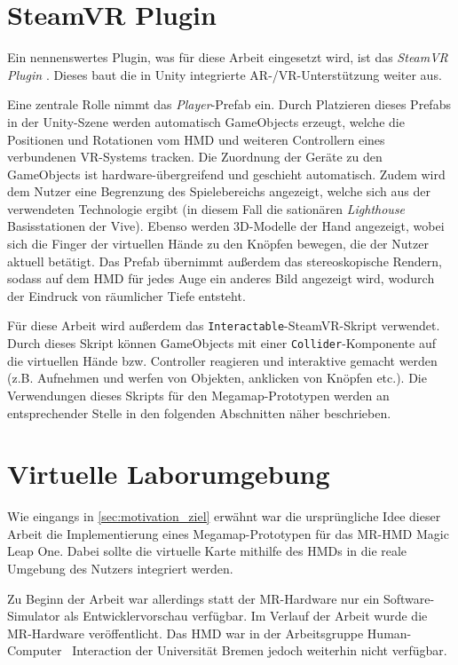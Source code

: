 \section{SteamVR Plugin}
Ein nennenswertes Plugin, was für diese Arbeit eingesetzt wird, ist das \emph{SteamVR Plugin} \autocite{ValveCorporation2018}.
Dieses baut die in Unity integrierte AR-/VR-Unterstützung weiter aus.

Eine zentrale Rolle nimmt das \emph{Player}-Prefab ein.
Durch Platzieren dieses Prefabs in der Unity-Szene werden automatisch GameObjects erzeugt, welche die Positionen und Rotationen vom HMD und weiteren Controllern eines verbundenen VR-Systems tracken.
Die Zuordnung der Geräte zu den GameObjects ist hardware-übergreifend und geschieht automatisch.
Zudem wird dem Nutzer eine Begrenzung des Spielebereichs angezeigt, welche sich aus der verwendeten Technologie ergibt (in diesem Fall die sationären \emph{Lighthouse} Basisstationen der Vive).
Ebenso werden 3D-Modelle der Hand angezeigt, wobei sich die Finger der virtuellen Hände zu den Knöpfen bewegen, die der Nutzer aktuell betätigt.
Das Prefab übernimmt außerdem das stereoskopische Rendern, sodass auf dem HMD für jedes Auge ein anderes Bild angezeigt wird, wodurch der Eindruck von räumlicher Tiefe entsteht.

Für diese Arbeit wird außerdem das \lstinline{Interactable}-SteamVR-Skript verwendet.
Durch dieses Skript können GameObjects mit einer \lstinline{Collider}-Komponente auf die virtuellen Hände bzw. Controller reagieren und interaktive gemacht werden (z.B. Aufnehmen und werfen von Objekten, anklicken von Knöpfen etc.).
Die Verwendungen dieses Skripts für den Megamap-Prototypen werden an entsprechender Stelle in den folgenden Abschnitten näher beschrieben.

\section{Virtuelle Laborumgebung}
Wie eingangs in \autoref{sec:motivation_ziel} erwähnt war die ursprüngliche Idee dieser Arbeit die Implementierung eines Megamap-Prototypen für das MR-HMD Magic Leap One.
Dabei sollte die virtuelle Karte mithilfe des HMDs in die reale Umgebung des Nutzers integriert werden.

Zu Beginn der Arbeit war allerdings statt der MR-Hardware nur ein Software-Simulator als Entwicklervorschau verfügbar.
Im Verlauf der Arbeit wurde die MR-Hardware veröffentlicht.
Das HMD war in der Arbeitsgruppe Human-Computer~ Interaction der Universität Bremen jedoch weiterhin nicht verfügbar.

